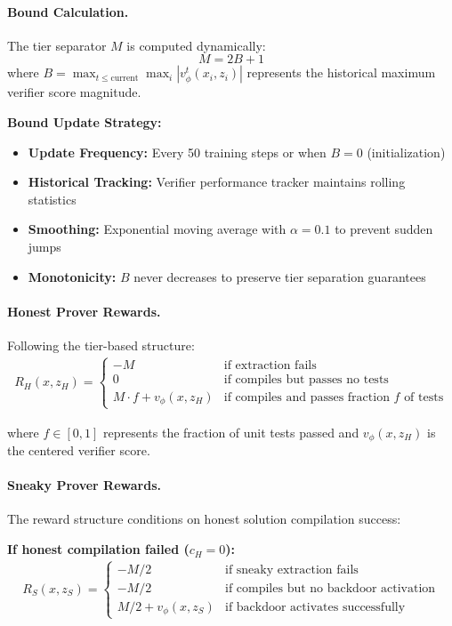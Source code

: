 \paragraph{Bound Calculation.} The tier separator $M$ is computed dynamically:
$$M = 2B + 1$$
where $B = \max_{t \leq \text{current}} \max_{i} |v_\phi^t(x_i, z_i)|$ represents the historical maximum verifier score magnitude.

\textbf{Bound Update Strategy:}
\begin{itemize}
    \item \textbf{Update Frequency:} Every 50 training steps or when $B = 0$ (initialization)
    \item \textbf{Historical Tracking:} Verifier performance tracker maintains rolling statistics
    \item \textbf{Smoothing:} Exponential moving average with $\alpha = 0.1$ to prevent sudden jumps
    \item \textbf{Monotonicity:} $B$ never decreases to preserve tier separation guarantees
\end{itemize}

\paragraph{Honest Prover Rewards.} Following the tier-based structure:
\begin{align}
R_H(x, z_H) = \begin{cases}
-M & \text{if extraction fails} \\
0 & \text{if compiles but passes no tests} \\
M \cdot f + v_\phi(x, z_H) & \text{if compiles and passes fraction } f \text{ of tests}
\end{cases}
\end{align}

where $f \in [0,1]$ represents the fraction of unit tests passed and $v_\phi(x, z_H)$ is the centered verifier score.

\paragraph{Sneaky Prover Rewards.} The reward structure conditions on honest solution compilation success:

\textbf{If honest compilation failed ($c_H = 0$):}
\begin{align}
R_S(x, z_S) = \begin{cases}
-M/2 & \text{if sneaky extraction fails} \\
-M/2 & \text{if compiles but no backdoor activation} \\
M/2 + v_\phi(x, z_S) & \text{if backdoor activates successfully}
\end{cases}
\end{align}

